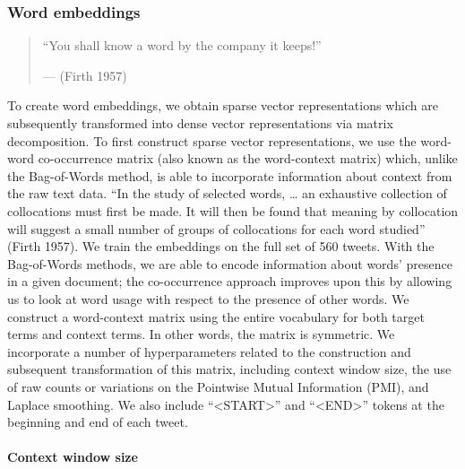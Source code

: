 \documentclass{article}
\begin{document}
\hypertarget{word-embeddings}{%
\subsubsection{Word embeddings}\label{word-embeddings}}

\begin{quote}
``You shall know a word by the company it keeps!''

--- (Firth 1957)
\end{quote}

To create word embeddings, we obtain sparse vector representations which
are subsequently transformed into dense vector representations via
matrix decomposition. To first construct sparse vector representations,
we use the word-word co-occurrence matrix (also known as the
word-context matrix) which, unlike the Bag-of-Words method, is able to
incorporate information about context from the raw text data. ``In the
study of selected words, \ldots{} an exhaustive collection of
collocations must first be made. It will then be found that meaning by
collocation will suggest a small number of groups of collocations for
each word studied'' (Firth 1957). We train the embeddings on the full
set of 560 tweets. With the Bag-of-Words methods, we are able to encode
information about words' presence in a given document; the co-occurrence
approach improves upon this by allowing us to look at word usage with
respect to the presence of other words. We construct a word-context
matrix using the entire vocabulary for both target terms and context
terms. In other words, the matrix is symmetric. We incorporate a number
of hyperparameters related to the construction and subsequent
transformation of this matrix, including context window size, the use of
raw counts or variations on the Pointwise Mutual Information (PMI), and
Laplace smoothing. We also include ``\textless START\textgreater{}'' and
``\textless END\textgreater{}'' tokens at the beginning and end of each
tweet.

\hypertarget{context-window-size}{%
\paragraph{Context window size}\label{context-window-size}}
\end{document}
